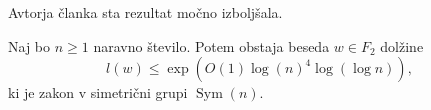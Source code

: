 
Avtorja članka \cite{Kozma_Thom_2016} sta rezultat močno izboljšala.
\begin{izrek}\label{izr_kozma_thom_glavni}
    Naj bo $n \ge 1$ naravno število. Potem obstaja beseda $w \in F_2$ dolžine 
    \begin{equation*}
        l(w)  \le \exp(O(1) \log(n)^4 \log (\log n)),
    \end{equation*}
    ki je zakon v simetrični grupi $\operatorname{Sym}(n)$. 
\end{izrek}

